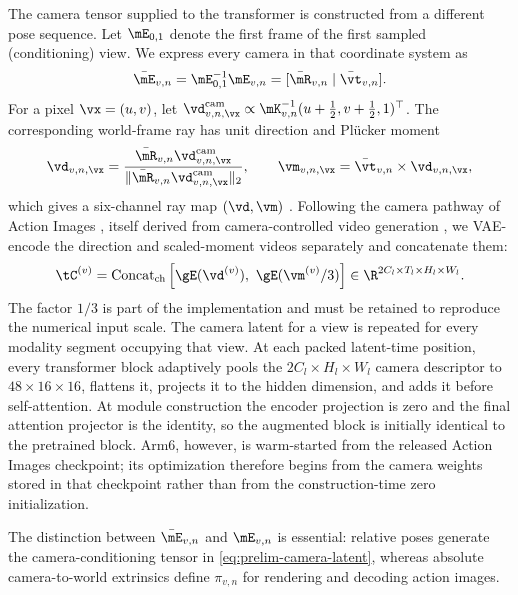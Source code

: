 The camera tensor supplied to the transformer is constructed from a different pose sequence.
Let $\mE_{0,1}$ denote the first frame of the first sampled (conditioning) view. We express every
camera in that coordinate system as
\begin{equation}
    \bar{\mE}_{v,n}=\mE_{0,1}^{-1}\mE_{v,n}=[\bar{\mR}_{v,n}\mid\bar{\vt}_{v,n}].
    \label{eq:prelim-relative-camera}
\end{equation}
For a pixel $\vx=(u,v)$, let
$\vd^{\mathrm{cam}}_{v,n,\vx}\propto\mK_{v,n}^{-1}(u+\tfrac12,v+\tfrac12,1)^{\top}$.
The corresponding world-frame ray has unit direction and Pl\"ucker moment
\begin{equation}
    \vd_{v,n,\vx}
    =\frac{\bar{\mR}_{v,n}\vd^{\mathrm{cam}}_{v,n,\vx}}
           {\|\bar{\mR}_{v,n}\vd^{\mathrm{cam}}_{v,n,\vx}\|_2},
    \qquad
    \vm_{v,n,\vx}=\bar{\vt}_{v,n}\times\vd_{v,n,\vx},
    \label{eq:prelim-plucker}
\end{equation}
which gives a six-channel ray map $(\vd,\vm)$ \citep{sitzmann2021lfn}. Following the camera
pathway of Action Images \citep{zhen2026action}, itself derived from camera-controlled video
generation \citep{bai2025recammaster}, we VAE-encode the direction and scaled-moment videos
separately and concatenate them:
\begin{equation}
    \tC^{(v)}
    =\operatorname{Concat}_{\mathrm{ch}}
      \left[\gE(\vd^{(v)}),\ \gE(\vm^{(v)}/3)\right]
    \in\R^{2C_l\times T_l\times H_l\times W_l}.
    \label{eq:prelim-camera-latent}
\end{equation}
The factor $1/3$ is part of the implementation and must be retained to reproduce the numerical
input scale. The camera latent for a view is repeated for every modality segment occupying
that view. At each packed latent-time position, every transformer block adaptively pools the
$2C_l\times H_l\times W_l$ camera descriptor to $48\times16\times16$, flattens it, projects it
to the hidden dimension, and adds it before self-attention. At module construction the encoder
projection is zero and the final attention projector is the identity, so the augmented block is
initially identical to the pretrained block. Arm6, however, is warm-started from the released
Action Images checkpoint; its optimization therefore begins from the camera weights stored in
that checkpoint rather than from the construction-time zero initialization.

The distinction between $\bar{\mE}_{v,n}$ and $\mE_{v,n}$ is essential: relative poses generate
the camera-conditioning tensor in \eqref{eq:prelim-camera-latent}, whereas absolute camera-to-world
extrinsics define $\pi_{v,n}$ for rendering and decoding action images.

